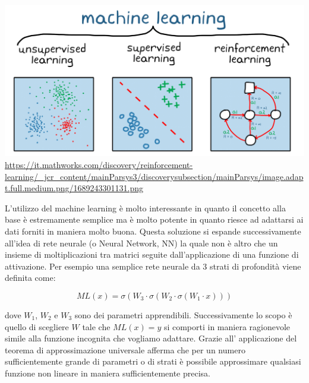 \begin{minipage}{\linewidth}
    \centering
    \includegraphics[width=\textwidth]{img/1689243301131.png}
    \url{https://it.mathworks.com/discovery/reinforcement-learning/_jcr_content/mainParsys3/discoverysubsection/mainParsys/image.adapt.full.medium.png/1689243301131.png}
    \label{fig:ML_example}
\end{minipage}

L'utilizzo del machine learning è molto interessante in quanto il concetto 
alla base è estremamente semplice ma è molto potente in quanto riesce ad 
adattarsi ai dati forniti in maniera molto buona. Questa soluzione si espande 
successivamente all'idea di rete neurale (o Neural Network, NN) la quale 
non è altro che un insieme di moltiplicazioni tra matrici seguite
dall'applicazione di una funzione di attivazione. Per esempio una semplice 
rete neurale da 3 strati di profondità viene definita come:

$$ML(x) = \sigma(W_3 \cdot \sigma(W_2 \cdot \sigma(W_1 \cdot x)))$$

dove $W_1$, $W_2$ e $W_3$ sono dei parametri apprendibili. Successivamente 
lo scopo è quello di scegliere $W$ tale che $ML(x) = y$ si comporti in maniera
ragionevole simile alla funzione incognita che vogliamo adattare. Grazie all'
applicazione del teorema di approssimazione universale 
afferma che per un numero sufficientemente grande di parametri o di strati 
è possibile approssimare qualsiasi funzione non lineare in maniera 
sufficientemente precisa. 

